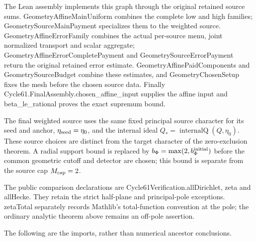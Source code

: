 \documentclass[11pt,a4paper]{article}
\newcommand{\sourcecode}[1]{{\small\ttfamily #1}}
\begin{document}
The Lean assembly implements this graph through the original retained
source sums. \sourcecode{Geometry\allowbreak{}Affine\allowbreak{}Main\allowbreak{}Uniform} combines the complete
low and high families; \sourcecode{Geometry\allowbreak{}Source\allowbreak{}Main\allowbreak{}Payment} specializes
them to the weighted source. \sourcecode{Geometry\allowbreak{}Affine\allowbreak{}Error\allowbreak{}Family} combines
the actual per-source menu, joint normalized transport and scalar
aggregate; \sourcecode{Geometry\allowbreak{}Affine\allowbreak{}Error\allowbreak{}Complete\allowbreak{}Payment} and
\sourcecode{Geometry\allowbreak{}Source\allowbreak{}Error\allowbreak{}Payment} return the original retained error
estimate. \sourcecode{Geometry\allowbreak{}Affine\allowbreak{}Paid\allowbreak{}Components} and
\sourcecode{Geometry\allowbreak{}Source\allowbreak{}Budget} combine these estimates, and
\sourcecode{Geometry\allowbreak{}Chosen\allowbreak{}Setup} fixes the mesh before the chosen source
data. Finally
\sourcecode{Cycle61.\allowbreak{}FinalAssembly.\allowbreak{}chosen\_\allowbreak{}\allowbreak{}affine\_\allowbreak{}\allowbreak{}input} supplies
the affine input and \sourcecode{beta\_\allowbreak{}\allowbreak{}le\_\allowbreak{}\allowbreak{}rational} proves the exact
supremum bound.

The final weighted source uses the same fixed principal source character
for its seed and anchor, \(\eta_{\rm seed}=\eta_0\), and the internal
ideal \(Q_*=\operatorname{internalQ}(Q,\eta_0)\). These source choices
are distinct from the target character of the zero-exclusion theorem. A
radial support bound is replaced by
\(b_\Phi=\max(2,b_\Phi^{\rm initial})\) before the common geometric
cutoff and detector are chosen; this bound is separate from the source
cap \(M_{\rm cap}=2\).

The public comparison declarations are
\sourcecode{Cycle61Verification.\allowbreak{}all\allowbreak{}Dirichlet}, \sourcecode{zeta} and
\sourcecode{all\allowbreak{}Hecke}. They retain the strict half-plane and principal-pole
exceptions. \sourcecode{zeta\allowbreak{}Total} separately records Mathlib's
total-function convention at the pole; the ordinary analytic theorem
above remains an off-pole assertion.

The following are the imports, rather than numerical ancestor
conclusions.
\end{document}
